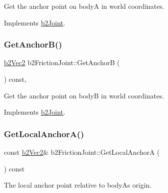 Get the anchor point on bodyA in world coordinates. 



Implements \mbox{\hyperlink{classb2_joint_abe46ca3aad5db73909a9b5a7b2117447}{b2\+Joint}}.

\mbox{\label{classb2_friction_joint_af5a025b64221aafa98393d47d8414328}} 
\subsubsection{\texorpdfstring{GetAnchorB()}{GetAnchorB()}}
{\footnotesize\ttfamily \mbox{\hyperlink{structb2_vec2}{b2\+Vec2}} b2\+Friction\+Joint\+::\+Get\+AnchorB (\begin{DoxyParamCaption}{ }\end{DoxyParamCaption}) const\hspace{0.3cm}{\ttfamily [override]}, {\ttfamily [virtual]}}



Get the anchor point on bodyB in world coordinates. 



Implements \mbox{\hyperlink{classb2_joint_a88e947c65d4ea26fe539f02a8cb7f7a9}{b2\+Joint}}.

\mbox{\label{classb2_friction_joint_a34023581ada2b4fba11e058695b49dd7}} 
\subsubsection{\texorpdfstring{GetLocalAnchorA()}{GetLocalAnchorA()}}
{\footnotesize\ttfamily const \mbox{\hyperlink{structb2_vec2}{b2\+Vec2}}\& b2\+Friction\+Joint\+::\+Get\+Local\+AnchorA (\begin{DoxyParamCaption}{ }\end{DoxyParamCaption}) const\hspace{0.3cm}{\ttfamily [inline]}}



The local anchor point relative to bodyA\textquotesingle{}s origin. 

\mbox{\label{classb2_friction_joint_a44fab4532f7c4aad9d833f009caac586}} 
